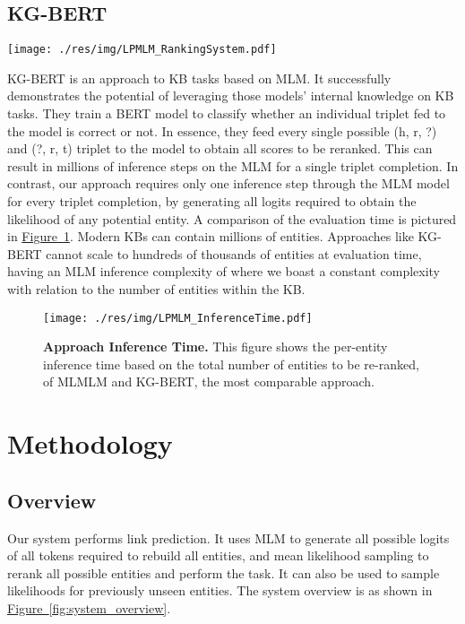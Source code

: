 \documentclass[11pt,a4paper]{article}
\newcommand{\RefFigure}[1]{\hyperref[#1]{Figure~\ref{#1}}}
\newcommand{\Figure}[4]{\begin{figure}[H]
    \centering
    #1
    \captionsetup{
        labelfont=bf,
        justification=raggedright,
        singlelinecheck=off,
        width=.95\linewidth}
    \caption{\textbf{#3.} #4}
    \label{#2}
\end{figure}}
\newcommand{\FigureW}[4]{\begin{figure*}[h!]
    \centering
    #1
    \captionsetup{
        labelfont=bf,
        justification=raggedright,
        singlelinecheck=off,
        width=.95\linewidth}
    \caption{\textbf{#3.} #4}
    \label{#2}
\end{figure*}}
\begin{document}
\subsection{KG-BERT}
\FigureW
{\texttt{[image: ./res/img/LPMLM\_RankingSystem.pdf]}}
{fig:ranking_system}
{Ranking System}
{The figure details the inner workings of the ranking system which uses the lookup table generated by the masked language model to compute the score associated with each possible entity.
The scored entities are then ranked by highest score. \vspace{-.5em}}



KG-BERT is an approach to KB tasks based on MLM.
It successfully demonstrates the potential of leveraging those models' internal knowledge on KB tasks.
They train a BERT model to classify whether an individual triplet fed to the model is correct or not. 
In essence, they feed every single possible (h, r, ?) and (?, r, t) triplet to the model to obtain all scores to be reranked.
This can result in millions of inference steps on the MLM for a single triplet completion.
In contrast, our approach requires only one inference step through the MLM model for every triplet completion, by generating all logits required to obtain the likelihood of any potential entity. 
A comparison of the evaluation time is pictured in \RefFigure{fig:inference_time}.
Modern KBs can contain millions of entities.
Approaches like KG-BERT cannot scale to hundreds of thousands of entities at evaluation time, having an MLM inference complexity of  where we boast a constant complexity with relation to the number of entities within the KB.

\vspace{-1em}

\Figure
{\texttt{[image: ./res/img/LPMLM\_InferenceTime.pdf]}}
{fig:inference_time}
{Approach Inference Time}
{This figure shows the per-entity inference time based on the total number of entities to be re-ranked, of MLMLM and KG-BERT, the most comparable approach. \vspace{-1.5em}}


\section{Methodology}


\subsection{Overview}
Our system performs link prediction.
It uses MLM to generate all possible logits of all tokens required to rebuild all entities, and mean likelihood sampling to rerank all possible entities and perform the task.
It can also be used to sample likelihoods for previously unseen entities.
The system overview is as shown in \RefFigure{fig:system_overview}. 
\end{document}
